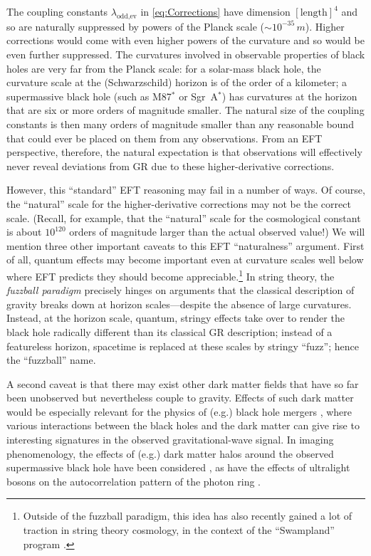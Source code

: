 \documentclass[graybox,envcountchap]{svmult}
\begin{document}
\bigskip


The coupling constants $\lambda_{\text{odd,ev}}$ in \eqref{eq:Corrections} have dimension $[\text{length}]^4$ and so are naturally suppressed by powers of the Planck scale ($\sim 10^{-35}\,m$).
Higher corrections would come with even higher powers of the curvature and so would be even further suppressed.
The curvatures involved in observable properties of black holes are very far from the Planck scale: for a solar-mass black hole, the curvature scale at the (Schwarzschild) horizon is of the order of a kilometer; a supermassive black hole (such as M87$^*$ or Sgr~A$^*$) has curvatures at the horizon that are six or more orders of magnitude smaller.
The natural size of the coupling constants is then many orders of magnitude smaller than any reasonable bound that could ever be placed on them from any observations.
From an EFT perspective, therefore, the natural expectation is that observations will effectively never reveal deviations from GR due to these higher-derivative corrections.

However, this ``standard'' EFT reasoning may fail in a number of ways.
Of course, the ``natural'' scale for the higher-derivative corrections may not be the correct scale.
(Recall, for example, that the ``natural'' scale for the cosmological constant is about $10^{120}$ orders of magnitude larger than the actual observed value!)
We will mention three other important caveats to this EFT ``naturalness'' argument.
First of all, quantum effects may become important even at curvature scales well below where EFT predicts they should become appreciable.\footnote{Outside of the fuzzball paradigm, this idea has also recently gained a lot of traction in string theory cosmology, in the context of the ``Swampland'' program \cite{Palti2019}.}
In string theory, the \emph{fuzzball paradigm} \cite{Mathur2005,Mayerson2020,Mayerson2023} precisely hinges on arguments that the classical description of gravity breaks down at horizon scales---despite the absence of large curvatures.
Instead, at the horizon scale, quantum, stringy effects take over to render the black hole radically different than its classical GR description; instead of a featureless horizon, spacetime is replaced at these scales by stringy ``fuzz''; hence the ``fuzzball'' name.

A second caveat is that there may exist other dark matter fields that have so far been unobserved but nevertheless couple to gravity.
Effects of such dark matter would be especially relevant for the physics of (e.g.) black hole mergers \cite{Barausse2020}, where various interactions between the black holes and the dark matter can give rise to interesting signatures in the observed gravitational-wave signal.
In imaging phenomenology, the effects of (e.g.) dark matter halos around the observed supermassive black hole have been considered \cite{Hou2018}, as have the effects of ultralight bosons on the autocorrelation pattern of the photon ring \cite{Chen2023}.
\end{document}
